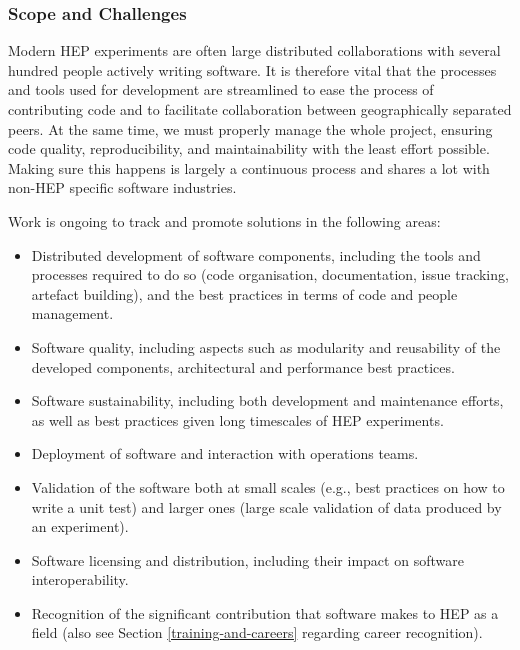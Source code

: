 \subsubsection*{Scope and Challenges}

Modern HEP experiments are often large distributed collaborations
with several hundred people actively writing software. It is
therefore vital that the processes and tools used for development are
streamlined to ease the process of contributing code and to facilitate
collaboration between geographically separated peers. At the same time,
we must properly manage the whole project, ensuring code quality,
reproducibility, and maintainability with the least effort possible.
Making sure this happens is largely a continuous process and shares a
lot with non-HEP specific software industries.

Work is ongoing to track and promote solutions in the following areas:

\begin{itemize}
\item
  Distributed development of software components, including the tools
  and processes required to do so (code organisation, documentation,
  issue tracking, artefact building), and the best practices in terms of
  code and people management.
\item
  Software quality, including aspects such as modularity and reusability
  of the developed components, architectural and performance best
  practices.
\item
  Software sustainability, including both development and maintenance
  efforts, as well as best practices given long timescales of HEP
  experiments.
\item
  Deployment of software and interaction with operations teams.
\item
  Validation of the software both at small scales (e.g., best practices
  on how to write a unit test) and larger ones (large scale validation
  of data produced by an experiment).
\item
  Software licensing and distribution, including their impact on
  software interoperability.
\item
  Recognition of the significant contribution that software makes to HEP
  as a field (also see Section \ref{training-and-careers} regarding
  career recognition).
\end{itemize}

